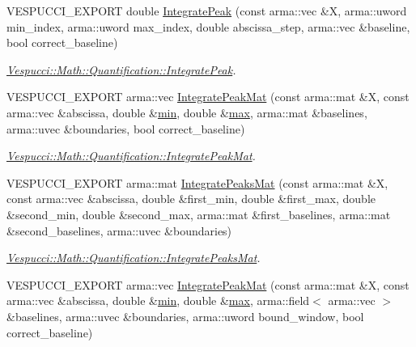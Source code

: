 \begin{DoxyCompactItemize}
\item 
V\+E\+S\+P\+U\+C\+C\+I\+\_\+\+E\+X\+P\+O\+RT double \hyperlink{namespace_vespucci_1_1_math_1_1_quantification_a11538f6f534fe18820b5519c0164968c}{Integrate\+Peak} (const arma\+::vec \&X, arma\+::uword min\+\_\+index, arma\+::uword max\+\_\+index, double abscissa\+\_\+step, arma\+::vec \&baseline, bool correct\+\_\+baseline)
\begin{DoxyCompactList}\small\item\em \hyperlink{namespace_vespucci_1_1_math_1_1_quantification_a11538f6f534fe18820b5519c0164968c}{Vespucci\+::\+Math\+::\+Quantification\+::\+Integrate\+Peak}. \end{DoxyCompactList}\item 
V\+E\+S\+P\+U\+C\+C\+I\+\_\+\+E\+X\+P\+O\+RT arma\+::vec \hyperlink{namespace_vespucci_1_1_math_1_1_quantification_a9235b27f7823d4c3e9153aa20c9168a0}{Integrate\+Peak\+Mat} (const arma\+::mat \&X, const arma\+::vec \&abscissa, double \&\hyperlink{namespace_vespucci_1_1_math_a884dc00603c6aed8e2ee23988c429c64}{min}, double \&\hyperlink{namespace_vespucci_1_1_math_a3d8f536b4465a4bacce89a51e3854daf}{max}, arma\+::mat \&baselines, arma\+::uvec \&boundaries, bool correct\+\_\+baseline)
\begin{DoxyCompactList}\small\item\em \hyperlink{namespace_vespucci_1_1_math_1_1_quantification_a9235b27f7823d4c3e9153aa20c9168a0}{Vespucci\+::\+Math\+::\+Quantification\+::\+Integrate\+Peak\+Mat}. \end{DoxyCompactList}\item 
V\+E\+S\+P\+U\+C\+C\+I\+\_\+\+E\+X\+P\+O\+RT arma\+::mat \hyperlink{namespace_vespucci_1_1_math_1_1_quantification_ab4aac91c1126f5c95416167055e6f843}{Integrate\+Peaks\+Mat} (const arma\+::mat \&X, const arma\+::vec \&abscissa, double \&first\+\_\+min, double \&first\+\_\+max, double \&second\+\_\+min, double \&second\+\_\+max, arma\+::mat \&first\+\_\+baselines, arma\+::mat \&second\+\_\+baselines, arma\+::uvec \&boundaries)
\begin{DoxyCompactList}\small\item\em \hyperlink{namespace_vespucci_1_1_math_1_1_quantification_ab4aac91c1126f5c95416167055e6f843}{Vespucci\+::\+Math\+::\+Quantification\+::\+Integrate\+Peaks\+Mat}. \end{DoxyCompactList}\item 
V\+E\+S\+P\+U\+C\+C\+I\+\_\+\+E\+X\+P\+O\+RT arma\+::vec \hyperlink{namespace_vespucci_1_1_math_1_1_quantification_a8b72f09c5b4d178c7c6070b3d19e9fbd}{Integrate\+Peak\+Mat} (const arma\+::mat \&X, const arma\+::vec \&abscissa, double \&\hyperlink{namespace_vespucci_1_1_math_a884dc00603c6aed8e2ee23988c429c64}{min}, double \&\hyperlink{namespace_vespucci_1_1_math_a3d8f536b4465a4bacce89a51e3854daf}{max}, arma\+::field$<$ arma\+::vec $>$ \&baselines, arma\+::uvec \&boundaries, arma\+::uword bound\+\_\+window, bool correct\+\_\+baseline)

\end{DoxyCompactItemize}
